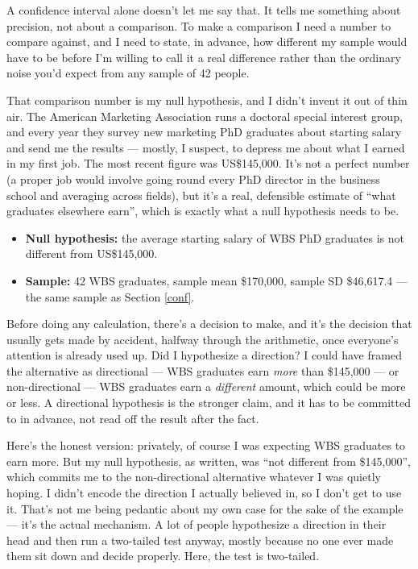 \documentclass[
]{book}
\providecommand{\tightlist}{%
  \setlength{\itemsep}{0pt}\setlength{\parskip}{0pt}}
\begin{document}
A confidence interval alone doesn't let me say that. It tells me something about precision, not about a comparison. To make a comparison I need a number to compare against, and I need to state, in advance, how different my sample would have to be before I'm willing to call it a real difference rather than the ordinary noise you'd expect from any sample of 42 people.

That comparison number is my null hypothesis, and I didn't invent it out of thin air. The American Marketing Association runs a doctoral special interest group, and every year they survey new marketing PhD graduates about starting salary and send me the results --- mostly, I suspect, to depress me about what I earned in my first job. The most recent figure was US\$145,000. It's not a perfect number (a proper job would involve going round every PhD director in the business school and averaging across fields), but it's a real, defensible estimate of ``what graduates elsewhere earn'', which is exactly what a null hypothesis needs to be.

\begin{itemize}
\tightlist
\item
  \textbf{Null hypothesis:} the average starting salary of WBS PhD graduates is not different from US\$145,000.
\item
  \textbf{Sample:} 42 WBS graduates, sample mean \$170,000, sample SD \$46,617.4 --- the same sample as Section \ref{conf}.
\end{itemize}

Before doing any calculation, there's a decision to make, and it's the decision that usually gets made by accident, halfway through the arithmetic, once everyone's attention is already used up. Did I hypothesize a direction? I could have framed the alternative as directional --- WBS graduates earn \emph{more} than \$145,000 --- or non-directional --- WBS graduates earn a \emph{different} amount, which could be more or less. A directional hypothesis is the stronger claim, and it has to be committed to in advance, not read off the result after the fact.

Here's the honest version: privately, of course I was expecting WBS graduates to earn more. But my null hypothesis, as written, was ``not different from \$145,000'', which commits me to the non-directional alternative whatever I was quietly hoping. I didn't encode the direction I actually believed in, so I don't get to use it. That's not me being pedantic about my own case for the sake of the example --- it's the actual mechanism. A lot of people hypothesize a direction in their head and then run a two-tailed test anyway, mostly because no one ever made them sit down and decide properly. Here, the test is two-tailed.
\end{document}
